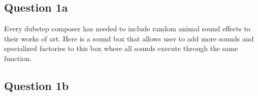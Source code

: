 \documentclass[12pt]{article}
\begin{document}
\subsection*{Question 1a}
Every dubstep composer has needed to include random animal sound effects to their works of art. Here is a sound box that allows user to add more sounds and specialized factories to this box where all sounds execute through the same function.

\subsection*{Question 1b}

\end{document}
